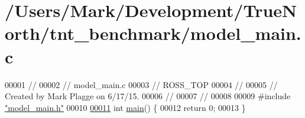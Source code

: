 \hypertarget{model__main_8c_source}{}\section{/\+Users/\+Mark/\+Development/\+True\+North/tnt\+\_\+benchmark/model\+\_\+main.c}

\begin{DoxyCode}
00001 \textcolor{comment}{//}
00002 \textcolor{comment}{//  model\_main.c}
00003 \textcolor{comment}{//  ROSS\_TOP}
00004 \textcolor{comment}{//}
00005 \textcolor{comment}{//  Created by Mark Plagge on 6/17/15.}
00006 \textcolor{comment}{//}
00007 \textcolor{comment}{//}
00008 
00009 \textcolor{preprocessor}{#}\textcolor{preprocessor}{include} \hyperlink{model__main_8h}{"model\_main.h"}
00010 
\hypertarget{model__main_8c_source_l00011}{}\hyperlink{model__main_8c_ae66f6b31b5ad750f1fe042a706a4e3d4}{00011} \textcolor{keywordtype}{int} \hyperlink{model__main_8c_ae66f6b31b5ad750f1fe042a706a4e3d4}{main}() \{
00012     \textcolor{keywordflow}{return} 0;
00013 \}
\end{DoxyCode}
